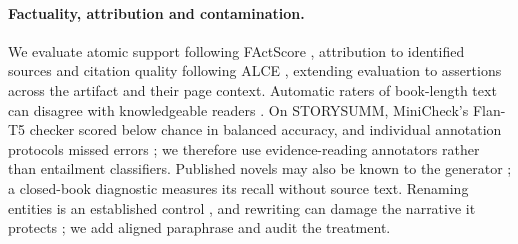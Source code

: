 \paragraph{Factuality, attribution and contamination.}
We evaluate atomic support following FActScore \citep{min2023factscore}, attribution to
identified sources \citep{rashkin2021ais} and citation quality following ALCE
\citep{gao2023alce}, extending evaluation to assertions across the artifact and their page
context. Automatic raters of book-length text can disagree with knowledgeable readers
\citep{kim2024fables}. On STORYSUMM, MiniCheck's Flan-T5 checker \citep{tang2024minicheck}
scored below chance in balanced accuracy, and individual annotation protocols missed errors \citep{subbiah2024storysumm}; we
therefore use evidence-reading annotators rather than entailment classifiers. Published
novels may also be known to the generator \citep{chang2023speak,cheng2025contamination}; a
closed-book diagnostic measures its recall without source text. Renaming entities is an
established control \citep{gupta2025whodunit,zhang2024infinitebench}, and rewriting can
damage the narrative it protects \citep{sun2025emperor}; we add aligned paraphrase and audit
the treatment.
